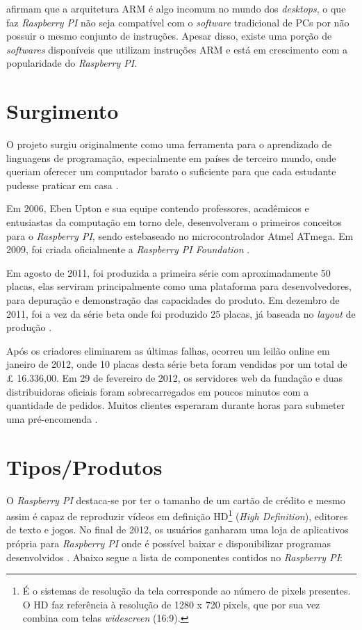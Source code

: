 \documentclass[
	12pt,				%
	openright,			%
	twoside,			%
	a4paper,			%
	chapter=TITLE,		%
	english,			%
	brazil				%
	]{abntex2}
\begin{document}
 afirmam que a arquitetura ARM é algo incomum no mundo dos \textit{desktops}, o que faz \textit{Raspberry PI} não seja compatível com o \textit{software} tradicional de PCs por não possuir o mesmo conjunto de instruções. Apesar disso, existe uma porção de \textit{softwares} disponíveis que utilizam instruções ARM e está em crescimento com a popularidade do \textit{Raspberry PI}.


\section{Surgimento}

O projeto surgiu originalmente como uma ferramenta para o aprendizado de linguagens de programação, especialmente em países de terceiro mundo, onde queriam oferecer um computador barato o suficiente para que cada estudante pudesse praticar em casa \cite{ClubeHardware}.

Em 2006, Eben Upton e sua equipe contendo professores, acadêmicos e entusiastas da computação em torno dele, desenvolveram o primeiros conceitos para o \textit{Raspberry PI}, sendo estebaseado no microcontrolador Atmel ATmega. Em 2009, foi criada oficialmente a \textit{Raspberry PI Foundation} \cite{eben2013raspberry}. 

Em agosto de 2011, foi produzida a primeira série com aproximadamente 50 placas, elas serviram principalmente como uma plataforma para desenvolvedores, para depuração e demonstração das capacidades do produto. Em dezembro de 2011, foi a vez da série beta onde foi produzido 25 placas, já baseada no \textit{layout} de produção \cite{Werner.Raspberry}.

Após os criadores eliminarem as últimas falhas, ocorreu um leilão online em janeiro de 2012, onde 10 placas desta série beta foram vendidas por um total de £ 16.336,00. Em 29 de fevereiro de 2012, os servidores web da fundação e duas distribuidoras oficiais foram sobrecarregados em poucos minutos com a quantidade de pedidos. Muitos clientes esperaram durante horas para submeter uma pré-encomenda \cite{Werner.Raspberry}.


\section{Tipos/Produtos}


O \textit{Raspberry PI} destaca-se por ter o tamanho de um cartão de crédito e mesmo assim é capaz de reproduzir vídeos em definição HD\footnote{É o sistemas de resolução da tela corresponde ao número de pixels presentes. O HD faz referência à resolução de 1280 x 720 pixels, que por sua vez combina com telas \textit{widescreen} (16:9).} (\textit{High Definition}), editores de texto e jogos. No final de 2012, os usuários ganharam uma loja de aplicativos própria para \textit{Raspberry PI} onde é possível baixar e disponibilizar programas desenvolvidos \cite{revistagalileu}. Abaixo segue a lista de componentes contidos no \textit{Raspberry PI}:
\end{document}
